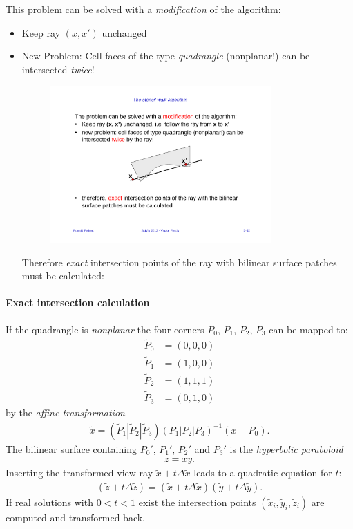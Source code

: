 This problem can be solved with a \emph{modification} of the algorithm:
\begin{itemize}
    \item Keep ray $(x,x')$ unchanged
    \item New Problem: Cell faces of the type \emph{quadrangle} (nonplanar!) can be intersected \emph{twice}!
    \begin{figure}[H]
    \centering
    \includegraphics[width=0.8\textwidth]{img/05_stencil_walk_improved}
    \end{figure}
    Therefore \emph{exact} intersection points of the ray with bilinear surface patches must be calculated:
\end{itemize}

\paragraph{Exact intersection calculation} If the quadrangle is \emph{nonplanar} the four corners $P_0$, $P_1$, $P_2$, $P_3$ can be mapped to:
\begin{align*}
    \tilde P_0 &= (0,0,0)\\
    \tilde P_1 &= (1,0,0)\\
    \tilde P_2 &= (1,1,1)\\
    \tilde P_3 &= (0,1,0)
\end{align*}
by the \emph{affine transformation}
\begin{align*}
    \tilde x = (\tilde P_1 | \tilde P_2 | \tilde P_3) (P_1|P_2|P_3)^{-1} (x-P_0).
\end{align*}
The bilinear surface containing $P_0'$, $P_1'$, $P_2'$ and $P_3'$ is the \emph{hyperbolic paraboloid}
\begin{align*}
    z = xy.
\end{align*}
Inserting the transformed view ray $\tilde x + t\Delta \tilde x$ leads to a quadratic equation for $t$:
\begin{align*}
    (\tilde z + t\Delta \tilde z) = (\tilde x+t\Delta \tilde x)(\tilde y + t\Delta \tilde y).
\end{align*}
If real solutions with $0<t<1$ exist the intersection points $(\tilde x_i, \tilde y_i, \tilde z_i)$ are computed and transformed back.

